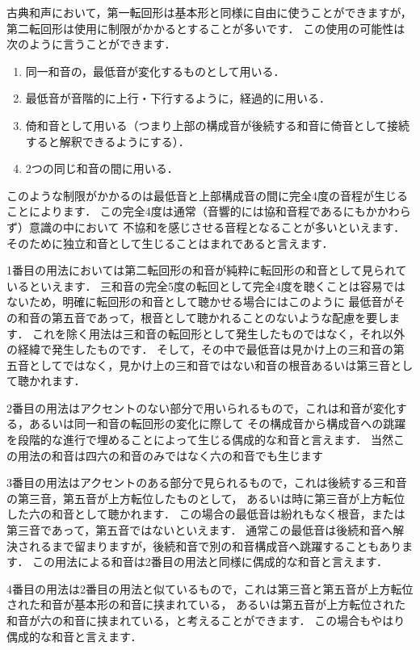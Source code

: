 \documentclass[dvipdfmx,uplatex,b5paper,openany,jbase=12Q,nomag*,textwidth-limit=44%
               ]{gachimuchi}
\begin{document}
\begin{Yodan}
古典和声において，第一転回形は基本形と同様に自由に使うことができますが，
第二転回形は使用に制限がかかるとすることが多いです．
この使用の可能性は次のように言うことができます．
\begin{enumerate}%
  \item 同一和音の，最低音が変化するものとして用いる．
  \item 最低音が音階的に上行・下行するように，経過的に用いる．
  \item 倚和音として用いる（つまり上部の構成音が後続する和音に倚音として接続すると解釈できるようにする）．
  \item 2つの同じ和音の間に用いる．
\end{enumerate}

このような制限がかかるのは最低音と上部構成音の間に完全4度の音程が生じることによります．
この完全4度は通常（音響的には協和音程であるにもかかわらず）意識の中において
不協和を感じさせる音程となることが多いといえます．
そのために独立和音として生じることはまれであると言えます．

1番目の用法においては第二転回形の和音が純粋に転回形の和音として見られているといえます．
三和音の完全5度の転回として完全4度を聴くことは容易ではないため，明確に転回形の和音として聴かせる場合にはこのように
最低音がその和音の第五音であって，根音として聴かれることのないような配慮を要します．
これを除く用法は三和音の転回形として発生したものではなく，それ以外の経緯で発生したものです．
そして，その中で最低音は見かけ上の三和音の第五音としてではなく，見かけ上の三和音ではない和音の根音あるいは第三音として聴かれます．

2番目の用法はアクセントのない部分で用いられるもので，これは和音が変化する，あるいは同一和音の転回形の変化に際して
その構成音から構成音への跳躍を段階的な進行で埋めることによって生じる偶成的な和音と言えます．
当然この用法の和音は四六の和音のみではなく六の和音でも生じます

3番目の用法はアクセントのある部分で見られるもので，これは後続する三和音の第三音，第五音が上方転位したものとして，
あるいは時に第三音が上方転位した六の和音として聴かれます．
この場合の最低音は紛れもなく根音，または第三音であって，第五音ではないといえます．
通常この最低音は後続和音へ解決されるまで留まりますが，後続和音で別の和音構成音へ跳躍することもあります．
この用法による和音は2番目の用法と同様に偶成的な和音と言えます．

4番目の用法は2番目の用法と似ているもので，これは第三音と第五音が上方転位された和音が基本形の和音に挟まれている，
あるいは第五音が上方転位された和音が六の和音に挟まれている，と考えることができます．
この場合もやはり偶成的な和音と言えます．


\end{Yodan}
\end{document}
